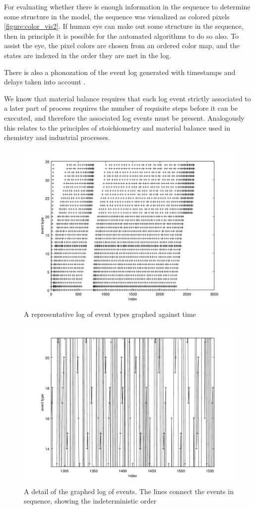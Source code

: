 \documentclass[journal]{IEEEtran}
\begin{document}
For evaluating whether there is enough information in the sequence to determine some structure in the model, the sequence was visualized as colored pixels \ref{figure:color_vis2}.
If human eye can make out some structure in the sequence, then in principle it is possible for the automated algorithms to do so also. To assist the eye, the pixel colors are chosen
from an ordered color map, and the states are indexed in the order they are met in the log.

There is also a phonozation of the event log generated with timestamps and delays taken into account \cite{PHONOZATION}.

We know that material balance requires that each log event strictly associated to a later part of process requires the number of requisite steps before it can be executed, and
therefore the associated log events must be present. Analogously this relates to the principles of stoichiometry and material balance used in chemistry and industrial processes.

\begin{figure}[tb]
 \centering
 \includegraphics[width=8 cm,keepaspectratio=true]{./events.png}
 \caption{A representative log of event types graphed against time}
 \label{figure:events}
\end{figure}

\begin{figure}[tb]
 \centering
 \includegraphics[width=8 cm,keepaspectratio=true]{./zoomed_events.png}
 \caption{A detail of the graphed log of events. The lines connect the events in sequence, showing the indeterministic order}
 \label{figure:zoomed_events}
\end{figure}
\end{document}
